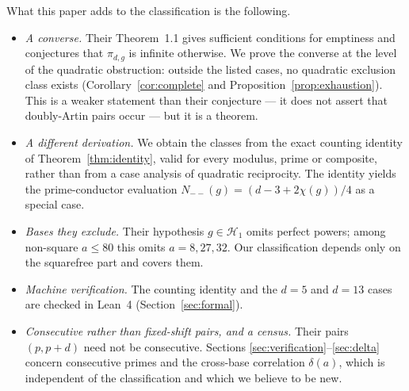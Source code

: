 \documentclass[11pt,reqno]{amsart}
\theoremstyle{plain}
\theoremstyle{definition}
\begin{document}
What this paper adds to the classification is the following.
\begin{itemize}
\item \emph{A converse.} Their Theorem~1.1 gives sufficient conditions for
      emptiness and conjectures that $\pi_{d,g}$ is infinite otherwise. We
      prove the converse at the level of the quadratic obstruction: outside
      the listed cases, no quadratic exclusion class exists
      (Corollary~\ref{cor:complete} and Proposition~\ref{prop:exhaustion}).
      This is a weaker statement than their conjecture --- it does not assert
      that doubly-Artin pairs occur --- but it is a theorem.
\item \emph{A different derivation.} We obtain the classes from the exact
      counting identity of Theorem~\ref{thm:identity}, valid for every
      modulus, prime or composite, rather than from a case analysis of
      quadratic reciprocity. The identity yields the prime-conductor
      evaluation $N_{--}(g) = (d - 3 + 2\chi(g))/4$ as a special case.
\item \emph{Bases they exclude.} Their hypothesis $g \in \mathcal{H}_1$
      omits perfect powers; among non-square $a \le 80$ this omits
      $a = 8, 27, 32$. Our classification depends only on the squarefree part
      and covers them.
\item \emph{Machine verification.} The counting identity and the $d = 5$ and
      $d = 13$ cases are checked in Lean~4 (Section~\ref{sec:formal}).
\item \emph{Consecutive rather than fixed-shift pairs, and a census.} Their
      pairs $(p, p+d)$ need not be consecutive. Sections
      \ref{sec:verification}--\ref{sec:delta} concern consecutive primes and
      the cross-base correlation $\delta(a)$, which is independent of the
      classification and which we believe to be new.
\end{itemize}
\end{document}
